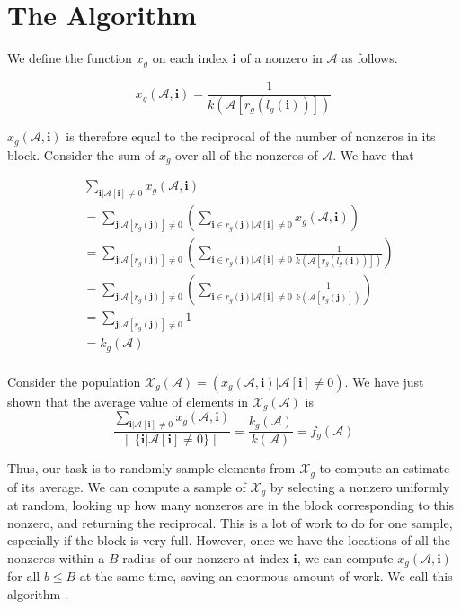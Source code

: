 \documentclass[12pt]{article}
\theoremstyle{dfn}
\numberwithin{equation}{section}
\numberwithin{figure}{section}
\renewcommand{\vec}[1] {\mathbf{#1}}
\newcommand{\Ten}[1] {\mathbf{\mathcal{#1}}}
\newcommand{\Pop}[1] {\mathcal{#1}}
\begin{document}
  \section{The Algorithm}

    We define the function $x_g$ on each index $\vec{i}$ of a nonzero in $\Ten{A}$ as follows.

    \[
      x_g(\Ten{A}, \vec{i}) = \frac{1}{k(\Ten{A}[r_g(l_g(\vec{i}))])}
    \]

    $x_g(\Ten{A}, \vec{i})$ is therefore equal to the reciprocal of the number of nonzeros in its block. Consider the sum of $x_g$ over all of the nonzeros of $\Ten{A}$. We have that

    \begin{align*}
      &\sum\limits_{\vec{i} | \Ten{A}[\vec{i}] \neq 0} x_g(\Ten{A}, \vec{i})\\ &= \sum\limits_{\vec{j} | \Ten{A}[r_g(\vec{j})] \neq 0} \left(\sum\limits_{\vec{i} \in r_g(\vec{j}) | \Ten{A}[\vec{i}] \neq 0} x_g(\Ten{A}, \vec{i})\right)\\
      &= \sum\limits_{\vec{j} | \Ten{A}[r_g(\vec{j})] \neq 0} \left(\sum\limits_{\vec{i} \in r_g(\vec{j}) | \Ten{A}[\vec{i}] \neq 0} \frac{1}{k(\Ten{A}[r_g(l_g(\vec{i}))])}\right)\\
      &= \sum\limits_{\vec{j} | \Ten{A}[r_g(\vec{j})] \neq 0} \left(\sum\limits_{\vec{i} \in r_g(\vec{j}) | \Ten{A}[\vec{i}] \neq 0} \frac{1}{k(\Ten{A}[r_g(\vec{j})])}\right)\\
      &= \sum\limits_{\vec{j} | \Ten{A}[r_g(\vec{j})] \neq 0} 1\\
      &= k_g(\Ten{A})\\
    \end{align*}

    Consider the population $\Pop{X}_g(\Ten{A}) = \left(x_g(\Ten{A}, \vec{i}) | \Ten{A}[\vec{i}] \neq 0\right)$. We have just shown that the average value of elements in $\Pop{X}_g(\Ten{A})$ is
    \[
      \frac{\sum\limits_{\vec{i} | \Ten{A}[\vec{i}] \neq 0} x_g(\Ten{A}, \vec{i})}{\|\{\vec{i} | \Ten{A}[\vec{i}] \neq 0\}\|} = \frac{k_g(\Ten{A})}{k(\Ten{A})} = f_g(\Ten{A})
    \]

    Thus, our task is to randomly sample elements from $\Pop{X}_g$ to compute an estimate of its average. We can compute a sample of $\Pop{X}_g$ by selecting a nonzero uniformly at random, looking up how many nonzeros are in the block corresponding to this nonzero, and returning the reciprocal. This is a lot of work to do for one sample, especially if the block is very full. However, once we have the locations of all the nonzeros within a $B$ radius of our nonzero at index $\vec{i}$, we can compute $x_g(\Ten{A}, \vec{i})$ for all $b \leq B$ at the same time, saving an enormous amount of work. We call this algorithm .
\end{document}
